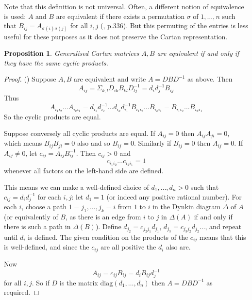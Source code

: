 \documentclass[11pt,a4paper]{report}
\newtheorem{proposition}[theorem]{Proposition}
\theoremstyle{definition}
\begin{document}
Note that this definition is not universal. Often, a different notion of equivalence is used: $A$ and $B$ are equivalent if there exists a permutation $\sigma$ of $1, \ldots, n$ such that $B_{ij} = A_{\sigma(i) \sigma(j)}$ for all $i, j$ (\cite{Carter}, p.336). But this permuting of the entries is less useful for these purposes as it does not preserve the Cartan representation.

\begin{proposition} \label{prop:equivcond} Generalised Cartan matrices $A, B$ are equivalent if and only if they have the same cyclic products. \end{proposition}

\begin{proof}(\cite{Vinberg}) Suppose $A, B$ are equivalent and write $A = DBD^{-1}$ as above. Then \begin{equation*}A_{ij} = \Sigma_{k, l} D_{ik} B_{kl} D^{-1}_{lj} = d_i d_j^{-1} B_{ij}\end{equation*} Thus \begin{equation*}A_{i_1i_2} \ldots A_{i_k i_1} = d_{i_1} d_{i_2}^{-1} \ldots d_{i_k} d_{i_1}^{-1} B_{i_1 i_2} \ldots B_{i_k i_1} = B_{i_1 i_2} \ldots B_{i_k i_1}\end{equation*} So the cyclic products are equal.

Suppose conversely all cyclic products are equal. If $A_{ij} = 0$ then $A_{ij} A_{ji} = 0$, which means $B_{ij} B_{ji} = 0$ also and so $B_{ij} = 0$. Similarly if $B_{ij} = 0$ then $A_{ij} = 0$. If $A_{ij} \neq 0$, let $c_{ij} = A_{ij} B_{ij}^{-1}$. Then $c_{ij} > 0$ and \begin{equation*}c_{i_1i_2} \ldots c_{i_k i_1} = 1\end{equation*} whenever all factors on the left-hand side are defined. 

This means we can make a well-defined choice of $d_1, \ldots, d_n > 0$ such that $c_{ij} = d_i d_j^{-1}$ for each $i, j$: let $d_1 = 1$ (or indeed any positive rational number). For each $i$, choose a path $1 = j_1, \ldots, j_k = i$ from $1$ to $i$ in the Dynkin diagram $\Delta$ of $A$ (or equivalently of $B$, as there is an edge from $i$ to $j$ in $\Delta(A)$ if and only if there is such a path in $\Delta(B)$). Define $d_{j_2} = c_{j_2j_1} d_{j_1}$, $d_{j_3} = c_{j_3j_2} d_{j_2}\ldots$, and repeat until $d_i$ is defined. The given condition on the products of the $c_{ij}$ means that this is well-defined, and since the $c_{ij}$ are all positive the $d_i$ also are. 

Now \begin{equation*}A_{ij} = c_{ij} B_{ij} = d_i B_{ij} d_j^{-1}\end{equation*} for all $i, j$. So if $D$ is the matrix $\text{diag}(d_1, \ldots, d_n)$ then $A = DBD^{-1}$ as required. \end{proof}
\end{document}
